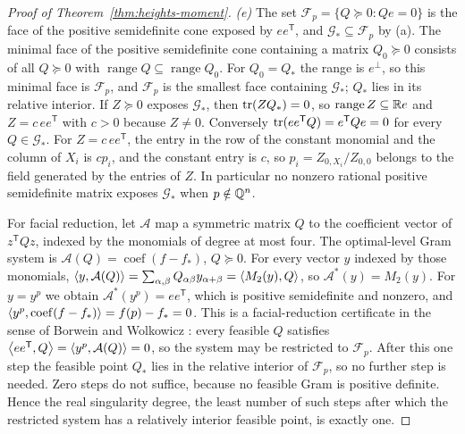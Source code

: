 \begin{proof}[Proof of Theorem~\ref{thm:heights-moment}]
\emph{(e)} The set $\mathcal F_p=\{Q\succeq0:Qe=0\}$ is the face of the
positive semidefinite cone exposed by $ee^{\mathsf T}$, and
$\mathcal G_*\subseteq\mathcal F_p$ by (a). The minimal face of the positive
semidefinite cone containing a matrix $Q_0\succeq0$ consists of all
$Q\succeq0$ with $\operatorname{range}Q\subseteq\operatorname{range}Q_0$. For
$Q_0=Q_*$ the range is $e^\perp$, so this minimal face is $\mathcal F_p$, and
$\mathcal F_p$ is the smallest face containing $\mathcal G_*$; $Q_*$ lies in
its relative interior. If $Z\succeq0$ exposes $\mathcal G_*$, then
$\operatorname{tr}(ZQ_*)=0$, so $\operatorname{range}Z\subseteq\mathbb R e$ and
$Z=c\,ee^{\mathsf T}$ with $c>0$ because $Z\ne0$. Conversely
$\operatorname{tr}(ee^{\mathsf T}Q)=e^{\mathsf T}Qe=0$ for every $Q\in\mathcal G_*$. For
$Z=c\,ee^{\mathsf T}$, the entry in the row of the constant monomial and the
column of $X_i$ is $cp_i$, and the constant entry is $c$, so
$p_i=Z_{0,X_i}/Z_{0,0}$ belongs to the field generated by the entries of $Z$.
In particular no nonzero rational positive semidefinite matrix exposes
$\mathcal G_*$ when $p\notin\mathbb Q^n$.

For facial reduction, let $\mathcal A$ map a symmetric matrix $Q$ to the
coefficient vector of $z^{\mathsf T}Qz$, indexed by the monomials of degree at
most four. The optimal-level Gram system is
$\mathcal A(Q)=\operatorname{coef}(f-f_*)$, $Q\succeq0$. For every vector $y$
indexed by those monomials,
$\left\langle y,\mathcal A(Q)\right\rangle=\sum_{\alpha,\beta}Q_{\alpha\beta}y_{\alpha+\beta}
=\left\langle M_2(y),Q\right\rangle$, so $\mathcal A^*(y)=M_2(y)$. For $y=y^p$ we obtain
$\mathcal A^*(y^p)=ee^{\mathsf T}$, which is positive semidefinite and nonzero,
and $\left\langle y^p,\operatorname{coef}(f-f_*)\right\rangle=f(p)-f_*=0$. This is a
facial-reduction certificate in the sense of Borwein and Wolkowicz
\cite{BorweinWolkowicz1981}: every feasible $Q$ satisfies
$\left\langle ee^{\mathsf T},Q\right\rangle=\left\langle y^p,\mathcal A(Q)\right\rangle=0$, so the system may be
restricted to $\mathcal F_p$. After this one step the feasible point $Q_*$
lies in the relative interior of $\mathcal F_p$, so no further step is
needed. Zero steps do not suffice, because no feasible Gram is positive
definite. Hence the real singularity degree, the least number of such steps
after which the restricted system has a relatively interior feasible point,
is exactly one.
\end{proof}

